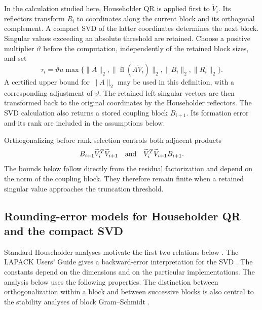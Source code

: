 \documentclass[11pt]{article}
\theoremstyle{definition}
\newcommand{\fl}{\operatorname{fl}}
\begin{document}
In the calculation studied here, Householder QR is applied first to
$\widetilde V_i$.  Its reflectors transform $R_i$ to coordinates along
the current block and its orthogonal complement.  A compact SVD of the
latter coordinates determines the next block.  Singular values exceeding
an absolute threshold are retained.  Choose a positive multiplier $\vartheta$
before the computation, independently of the retained block sizes, and set
\begin{equation}
 \tau_i=\vartheta u\max\{\|A\|_2,\|\fl(A\widetilde V_i)\|_2,
                  \|B_i\|_2,\|R_i\|_2\}.
 \label{eq:threshold}
\end{equation}
A certified upper bound for $\|A\|_2$ may be used in this definition, with a
corresponding adjustment of $\vartheta$.
The retained left singular vectors are then transformed back to the original
coordinates by the Householder reflectors.
The SVD calculation also returns a stored coupling block $B_{i+1}$.  Its
formation error and its rank are included in the assumptions below.

Orthogonalizing before rank selection controls both adjacent products
\[
 B_{i+1}\widetilde V_i^T\widetilde V_{i+1}
 \quad\hbox{and}\quad
 \widetilde V_i^T\widetilde V_{i+1}B_{i+1}.
\]
The bounds below follow directly from the residual factorization and depend
on the norm of the coupling block.  They therefore remain finite when a
retained singular value approaches the truncation threshold.

\subsection{Rounding-error models for Householder QR and the compact SVD}
\label{sec:block-algorithm}

Standard Householder analyses motivate the first two relations below
\cite[Lemma~19.3 and Theorem~19.4]{Higham2002}.  The LAPACK Users' Guide gives
a backward-error interpretation for the SVD 
\cite{LAPACKUsersGuide1999}.  The constants depend on the dimensions and on
the particular implementations.  The analysis below uses the following
properties.
The distinction between orthogonalization within a block and between
successive blocks is also central to the stability analyses of block
Gram--Schmidt \cite{CarsonLundRozloznik2021,CarsonLundRozloznikThomas2022}.
\end{document}

